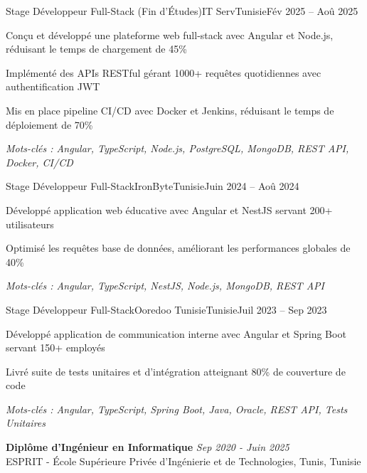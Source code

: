 \documentclass[11pt,a4paper]{article}
\begin{document}
\makecvheader
\makecontactinfo


\begin{internship}{Stage Développeur Full-Stack (Fin d'Études)}{IT Serv}{Tunisie}{Fév 2025 -- Aoû 2025}{}
  \item Conçu et développé une plateforme web full-stack avec Angular et Node.js, réduisant le temps de chargement de 45\%
  \item Implémenté des APIs RESTful gérant 1000+ requêtes quotidiennes avec authentification JWT
  \item Mis en place pipeline CI/CD avec Docker et Jenkins, réduisant le temps de déploiement de 70\%
  \item[] \textit{\footnotesize Mots-clés : Angular, TypeScript, Node.js, PostgreSQL, MongoDB, REST API, Docker, CI/CD}
\end{internship}

\begin{internship}{Stage Développeur Full-Stack}{IronByte}{Tunisie}{Juin 2024 -- Aoû 2024}{}
  \item Développé application web éducative avec Angular et NestJS servant 200+ utilisateurs
  \item Optimisé les requêtes base de données, améliorant les performances globales de 40\%
  \item[] \textit{\footnotesize Mots-clés : Angular, TypeScript, NestJS, Node.js, MongoDB, REST API}
\end{internship}

\begin{internship}{Stage Développeur Full-Stack}{Ooredoo Tunisie}{Tunisie}{Juil 2023 -- Sep 2023}{}
  \item Développé application de communication interne avec Angular et Spring Boot servant 150+ employés
  \item Livré suite de tests unitaires et d'intégration atteignant 80\% de couverture de code
  \item[] \textit{\footnotesize Mots-clés : Angular, TypeScript, Spring Boot, Java, Oracle, REST API, Tests Unitaires}
\end{internship}

\textbf{Diplôme d'Ingénieur en Informatique} \hfill \textit{Sep 2020 - Juin 2025}\\[-2pt]
ESPRIT - École Supérieure Privée d'Ingénierie et de Technologies, Tunis, Tunisie
\end{document}
